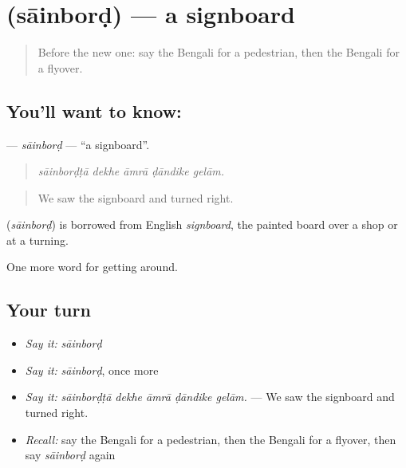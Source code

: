 \section[\texorpdfstring{\bn{সাইনবোর্ড} (sāinborḍ)}{সাইনবোর্ড (sāinborḍ)}]{ (sāinborḍ) — a signboard}

\label{lesson:BN-C392-sainbord}



\begin{quote}
Before the new one: say the Bengali for a pedestrian, then the Bengali for a flyover.
\end{quote}

\subsection*{You'll want to know: }
\textbf{} — \emph{sāinborḍ} — \textquotedblleft{}a signboard\textquotedblright{}.

\begin{quote}
    
\end{quote}

\begin{quote}
\emph{sāinborḍṭā dekhe āmrā ḍāndike gelām.}
\end{quote}

\begin{quote}
We saw the signboard and turned right.
\end{quote}

\begin{cousinweb}
\textbf{} (\emph{sāinborḍ}) is borrowed from English \emph{signboard}, the painted board over a shop or at a turning.
\end{cousinweb}

\begin{grammarlens}[title={What you've built}]
One more word for getting around.
\end{grammarlens}

\subsection*{Your turn}
\begin{itemize}
\raggedright
  \item \emph{Say it:} \emph{sāinborḍ}
  \item \emph{Say it:} \emph{sāinborḍ}, once more
  \item \emph{Say it:} \emph{sāinborḍṭā dekhe āmrā ḍāndike gelām.} — We saw the signboard and turned right.
  \item \emph{Recall:} say the Bengali for a pedestrian, then the Bengali for a flyover, then say \emph{sāinborḍ} again
\end{itemize}

